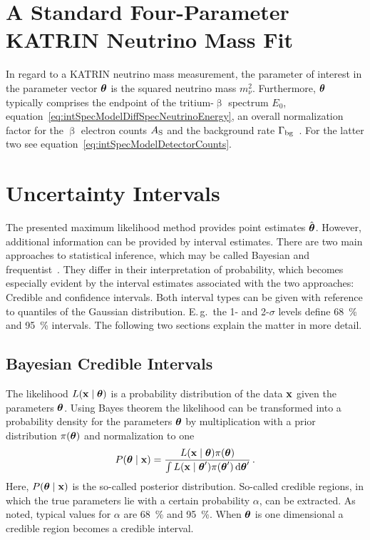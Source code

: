 \section{A Standard Four-Parameter KATRIN Neutrino Mass Fit}
\label{sec:statMethodsStandardFit}
In regard to a KATRIN neutrino mass measurement, the parameter of interest in the parameter vector $\boldsymbol{\mathbf{\theta}}$ is the squared neutrino mass $m_\nu^2$. Furthermore, $\boldsymbol{\mathbf{\theta}}$ typically comprises the endpoint of the tritium-$\upbeta$ spectrum $E_0$, equation~\eqref{eq:intSpecModelDiffSpecNeutrinoEnergy}, an overall normalization factor for the $\upbeta$ electron counts $A_{\mathrm{S}}$ and the background rate $\Gamma_{\mathrm{bg}}$~\cite{Kleesiek2014,Angrik:2005ep}. For the latter two see equation~\eqref{eq:intSpecModelDetectorCounts}.

\section{Uncertainty Intervals}
\label{sec:statMethodsUncertaintyIntervals}
The presented maximum likelihood method provides point estimates $\hat{\boldsymbol{\mathbf{\theta}}}$. However, additional information can be provided by interval estimates. There are two main approaches to statistical inference, which may be called Bayesian and frequentist~\cite{ReviewOfParticlePhysics}. They differ in their interpretation of probability, which becomes especially evident by the interval estimates associated with the two approaches: Credible and confidence intervals. Both interval types can be given with reference to quantiles of the Gaussian distribution. E.\,g.~the 1- and 2-$\sigma$ levels define \SI{68}{\percent} and \SI{95}{\percent} intervals. The following two sections explain the matter in more detail.

\subsection{Bayesian Credible Intervals}
The likelihood $L\giventhat{\dataVec}{\paramVec}$ is a probability distribution of the data $\boldsymbol{\mathbf{x}}$ given the parameters $\boldsymbol{\mathbf{\theta}}$. Using Bayes theorem the likelihood can be transformed into a probability density for the parameters $\boldsymbol{\mathbf{\theta}}$ by multiplication with a prior distribution $\pi(\boldsymbol{\mathbf{\theta}})$ and normalization to one~\cite{ReviewOfParticlePhysics}
\begin{equation}
\label{eq:statMethodsPosterior}
	P\giventhat{\paramVec}{\dataVec} = 
		\frac{
			L\giventhat{\dataVec}{\paramVec}\pi(\paramVec)
		}{
			\int L\giventhat{\dataVec}{\paramVec^\prime}\pi(\paramVec^\prime) \d\paramVec^\prime
		}
	\fullstop
\end{equation}
Here, $P\giventhat{\paramVec}{\dataVec}$ is the so-called posterior distribution. So-called credible regions, in which the true parameters lie with a certain probability $\alpha$, can be extracted. As noted, typical values for $\alpha$ are \SI{68}{\percent} and \SI{95}{\percent}. When $\boldsymbol{\mathbf{\theta}}$ is one dimensional a credible region becomes a credible interval. 

